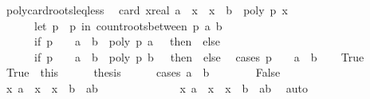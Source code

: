 \begin{isabellebody}
\isanewline
%
\endisadelimproof
\isanewline
{}\isamarkupfalse%
\ poly{\isacharunderscore}card{\isacharunderscore}roots{\isacharunderscore}leq{\isacharunderscore}less{\isacharcolon}\isanewline
\ \ {\isachardoublequoteopen}card\ {\isacharbraceleft}x{\isacharcolon}{\isacharcolon}real{\isachardot}\ a\ {\isasymle}\ x\ {\isasymand}\ x\ {\isacharless}\ b\ {\isasymand}\ poly\ p\ x\ {\isacharequal}\ {}{\isacharbraceright}\ {\isacharequal}\isanewline
\ \ \ \ \ \ {\isacharparenleft}let\ p\ {\isacharequal}\ p\ in\ count{\isacharunderscore}roots{\isacharunderscore}between\ p\ a\ b\ {\isacharplus}\isanewline
\ \ \ \ \ \ {\isacharparenleft}if\ p\ {\isasymnoteq}\ {}\ {\isasymand}\ a\ {\isacharless}\ b\ {\isasymand}\ poly\ p\ a\ {\isacharequal}\ {}\ then\ {}\ else\ {}{\isacharparenright}\ {\isacharminus}\isanewline
\ \ \ \ \ \ {\isacharparenleft}if\ p\ {\isasymnoteq}\ {}\ {\isasymand}\ a\ {\isacharless}\ b\ {\isasymand}\ poly\ p\ b\ {\isacharequal}\ {}\ then\ {}\ else\ {}{\isacharparenright}{\isacharparenright}{\isachardoublequoteclose}\isanewline
%
\isadelimproof
%
\endisadelimproof
%
\isatagproof
{}\isamarkupfalse%
\ {\isacharparenleft}cases\ {\isachardoublequoteopen}p\ {\isacharequal}\ {}\ {\isasymor}\ a\ {\isasymge}\ b{\isachardoublequoteclose}{\isacharparenright}\isanewline
\ \ \isamarkupfalse%
\ True\isanewline
\ \ \ \ \isamarkupfalse%
\ True{\isacharprime}\ {\isacharequal}\ this\isanewline
\ \ \ \ \isamarkupfalse%
\ {\isacharquery}thesis\isanewline
\ \ \ \ \isamarkupfalse%
\ {\isacharparenleft}cases\ {\isachardoublequoteopen}a\ {\isasymge}\ b{\isachardoublequoteclose}{\isacharparenright}\isanewline
\ \ \ \ \ \ \isamarkupfalse%
\ False\isanewline
\ \ \ \ \ \ \ \ \isamarkupfalse%
\ {\isachardoublequoteopen}{\isacharbraceleft}x{\isachardot}\ a\ {\isacharless}\ x\ {\isasymand}\ x\ {\isasymle}\ b{\isacharbraceright}\ {\isacharequal}\ {\isacharbraceleft}a{\isacharless}{\isachardot}{\isachardot}b{\isacharbraceright}{\isachardoublequoteclose}\isanewline
\ \ \ \ \ \ \ \ \ \ \ \ \ \ {\isachardoublequoteopen}{\isacharbraceleft}x{\isachardot}\ a\ {\isasymle}\ x\ {\isasymand}\ x\ {\isacharless}\ b{\isacharbraceright}\ {\isacharequal}\ {\isacharbraceleft}a{\isachardot}{\isachardot}{\isacharless}b{\isacharbraceright}{\isachardoublequoteclose}\ \isamarkupfalse%
\ auto\isanewline
\ \ \ \ \ \ \ \ \isamarkupfalse%

\end{isabellebody}
